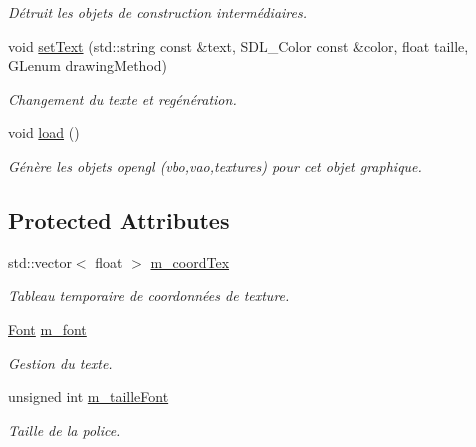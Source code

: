 \begin{DoxyCompactItemize}
\begin{DoxyCompactList}\small\item\em Détruit les objets de construction intermédiaires. \end{DoxyCompactList}\item 
\hypertarget{classLabel_a2691251a8ef0e53e31438feb5606ec35}{void \hyperlink{classLabel_a2691251a8ef0e53e31438feb5606ec35}{set\-Text} (std\-::string const \&text, S\-D\-L\-\_\-\-Color const \&color, float taille, G\-Lenum drawing\-Method)}\label{classLabel_a2691251a8ef0e53e31438feb5606ec35}

\begin{DoxyCompactList}\small\item\em Changement du texte et regénération. \end{DoxyCompactList}\item 
\hypertarget{classLabel_abf96331e65169cd9855dd3690da9de2b}{void \hyperlink{classLabel_abf96331e65169cd9855dd3690da9de2b}{load} ()}\label{classLabel_abf96331e65169cd9855dd3690da9de2b}

\begin{DoxyCompactList}\small\item\em Génère les objets opengl (vbo,vao,textures) pour cet objet graphique. \end{DoxyCompactList}\end{DoxyCompactItemize}
\subsection*{Protected Attributes}
\begin{DoxyCompactItemize}
\item 
\hypertarget{classLabel_a7f03adffc29da896d49f36d23a72c9b6}{std\-::vector$<$ float $>$ \hyperlink{classLabel_a7f03adffc29da896d49f36d23a72c9b6}{m\-\_\-coord\-Tex}}\label{classLabel_a7f03adffc29da896d49f36d23a72c9b6}

\begin{DoxyCompactList}\small\item\em Tableau temporaire de coordonnées de texture. \end{DoxyCompactList}\item 
\hypertarget{classLabel_a8661786a76b31418bc167e1e48b44ac8}{\hyperlink{classFont}{Font} \hyperlink{classLabel_a8661786a76b31418bc167e1e48b44ac8}{m\-\_\-font}}\label{classLabel_a8661786a76b31418bc167e1e48b44ac8}

\begin{DoxyCompactList}\small\item\em Gestion du texte. \end{DoxyCompactList}\item 
\hypertarget{classLabel_a29541e67ad5511df91e29ac41fe29aa7}{unsigned int \hyperlink{classLabel_a29541e67ad5511df91e29ac41fe29aa7}{m\-\_\-taille\-Font}}\label{classLabel_a29541e67ad5511df91e29ac41fe29aa7}

\begin{DoxyCompactList}\small\item\em Taille de la police. \end{DoxyCompactList}\end{DoxyCompactItemize}


